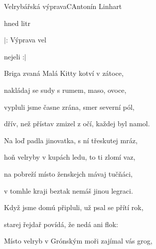\begin{song}{Velrybářská výprava}{C}{Antonín Linhart}

\begin{SBVerse}



 hned litr 


\end{SBVerse}

\begin{SBChorus}

$|$: Výprava vel

 nejeli  :$|$

\end{SBChorus}

\begin{SBVerse}

Briga zvaná Malá Kitty kotví v zátoce,

nakládaj se sudy s rumem, maso, ovoce,

vypluli jsme časne zrána, smer severní pól,

dřív, než přístav zmizel z očí, každej byl namol.

\end{SBVerse}

\begin{SBVerse}

Na loď padla jinovatka, s ní třeskutej mráz,

hoň velryby v kupách ledu, to ti zlomí vaz,

na pobreží místo ženskejch mávaj tučňáci,

v tomhle kraji beztak nemáš jinou legraci.

\end{SBVerse}

\begin{SBVerse}

Když jsme domú připluli, už psal se přítí rok,

starej řejdař povídá, že nedá ani flok:

Místo velryb v Grónským moři zajímal vás grog,


\end{SBVerse}
\end{song}

